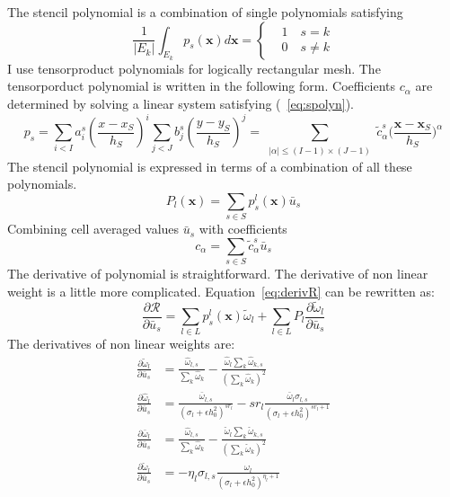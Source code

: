 \documentclass[smallextended]{svjour3}       %
\newcommand{\bfx}{{\mathbf x}}
\begin{document}
The stencil polynomial is a combination of single polynomials satisfying 
\begin{equation}\label{eq:spolyn}
		  \frac{1}{|E_k|} \int_{E_k} p_s(\bfx) d\bfx = \left \{ 
		  \begin{aligned}
					 &1 \quad s=k\\
					 &0 \quad s\neq k
		  \end{aligned}\right .
\end{equation}
I use tensorproduct polynomials for logically rectangular mesh.
The tensorporduct polynomial is written in the following form.
Coefficients $c_{\alpha}$ are determined by solving a linear
system satisfying (~\ref{eq:spolyn}).
\begin{equation}\label{eq:tensorProductPolyn}
		  p_s = \sum_{i < I} a^s_i (\frac{x-x_S}{h_S})^i \sum_{j < J} b^s_j (\frac{y-y_S}{h_S})^j = 
		  \sum_{\substack{\mid \alpha \mid \leq (I-1)\times (J-1)}} \tilde c^s_{\alpha} \Big(\frac{\bfx - \bfx_S}{h_S}\Big)^\alpha
\end{equation}
The stencil polynomial is expressed in terms of a 
combination of all these polynomials.
\begin{equation}\label{eq:Spolyn}
		  P_l(\bfx) = \sum_{s\in S} p^l_s(\bfx) \bar u_s
\end{equation}
Combining cell averaged values $\bar u_s$ with coefficients
\begin{equation}\label{eq:c_alpha}
		  c_{\alpha} = \sum_{s\in S} \tilde c^s_{\alpha} \bar u_s
\end{equation}
The derivative of polynomial is straightforward. The derivative of non linear weight is 
a little more complicated. Equation~\ref{eq:derivR} can be rewritten as:
\begin{equation}\label{eq:derivR_detail}
		  \frac{\partial \mathscr{R}}{\partial \bar u_s} = \sum_{l \in L} p^l_s(\bfx) \tilde \omega_l + 
		  \sum_{l\in L} P_l\frac{\partial \tilde \omega_l}{\partial \bar u_s}
\end{equation}
The derivatives of non linear weights are:
\begin{equation}\label{eq:derivNonlinearWgt}
		  \begin{aligned}
					 \frac{\partial \tilde \omega_l}{\partial \bar u_s} &= \frac{\hat \omega_{l,s}}{\sum_k \hat \omega_k} - 
		  \frac{\hat \omega_{l}\sum_k \hat \omega_{k,s}}{(\sum_k \hat \omega_{k})^2}\\
					 \frac{\partial \hat \omega_l}{\partial \bar u_s} &= \frac{\bar \omega_{l,s}}{(\sigma_l + \epsilon h_0^2)^{sr_l}} -
					 sr_l \frac{\bar \omega_l \sigma_{l,s}}{(\sigma_l + \epsilon h_0^2)^{sr_l+1}}\\
					 \frac{\partial \bar \omega_l}{\partial \bar u_s} &= \frac{\hat \omega_{l,s}}{\sum_k \hat \omega_k} - 
		  \frac{\check \omega_{l}\sum_k \check \omega_{k,s}}{(\sum_k \check \omega_{k})^2}\\
					 \frac{\partial \check \omega_l}{\partial \bar u_s} &= -\eta_l\sigma_{l,s}
					 \frac{\omega_l}{(\sigma_l + \epsilon h_0^2)^{\eta_l+1}}
		  \end{aligned}
\end{equation}
\end{document}
